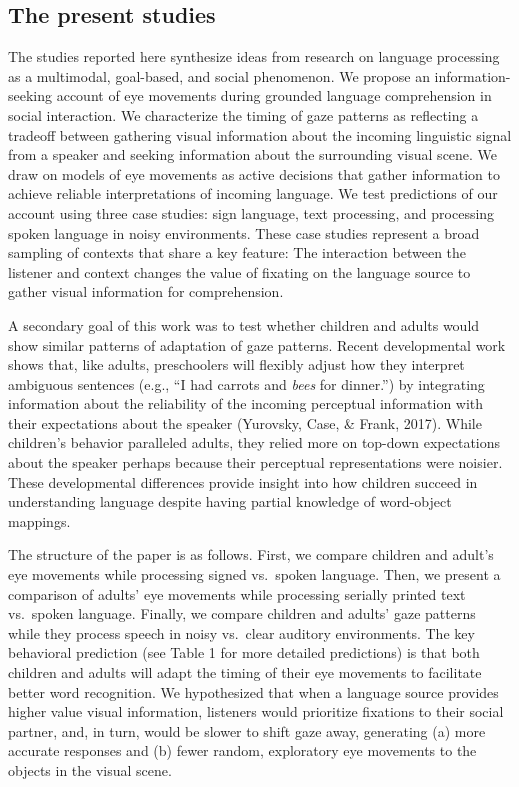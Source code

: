 \documentclass[english,floatsintext,man]{apa6}
\theoremstyle{definition}
\theoremstyle{definition}
\theoremstyle{definition}
\theoremstyle{remark}
\begin{document}
\hypertarget{the-present-studies}{%
\subsection{The present studies}\label{the-present-studies}}

The studies reported here synthesize ideas from research on language
processing as a multimodal, goal-based, and social phenomenon. We
propose an information-seeking account of eye movements during grounded
language comprehension in social interaction. We characterize the timing
of gaze patterns as reflecting a tradeoff between gathering visual
information about the incoming linguistic signal from a speaker and
seeking information about the surrounding visual scene. We draw on
models of eye movements as active decisions that gather information to
achieve reliable interpretations of incoming language. We test
predictions of our account using three case studies: sign language, text
processing, and processing spoken language in noisy environments. These
case studies represent a broad sampling of contexts that share a key
feature: The interaction between the listener and context changes the
value of fixating on the language source to gather visual information
for comprehension.

A secondary goal of this work was to test whether children and adults
would show similar patterns of adaptation of gaze patterns. Recent
developmental work shows that, like adults, preschoolers will flexibly
adjust how they interpret ambiguous sentences (e.g., \enquote{I had
carrots and \emph{bees} for dinner.}) by integrating information about
the reliability of the incoming perceptual information with their
expectations about the speaker (Yurovsky, Case, \& Frank, 2017). While
children's behavior paralleled adults, they relied more on top-down
expectations about the speaker perhaps because their perceptual
representations were noisier. These developmental differences provide
insight into how children succeed in understanding language despite
having partial knowledge of word-object mappings.

The structure of the paper is as follows. First, we compare children and
adult's eye movements while processing signed vs.~spoken language. Then,
we present a comparison of adults' eye movements while processing
serially printed text vs.~spoken language. Finally, we compare children
and adults' gaze patterns while they process speech in noisy vs.~clear
auditory environments. The key behavioral prediction (see Table 1 for
more detailed predictions) is that both children and adults will adapt
the timing of their eye movements to facilitate better word recognition.
We hypothesized that when a language source provides higher value visual
information, listeners would prioritize fixations to their social
partner, and, in turn, would be slower to shift gaze away, generating
(a) more accurate responses and (b) fewer random, exploratory eye
movements to the objects in the visual scene.
\end{document}
